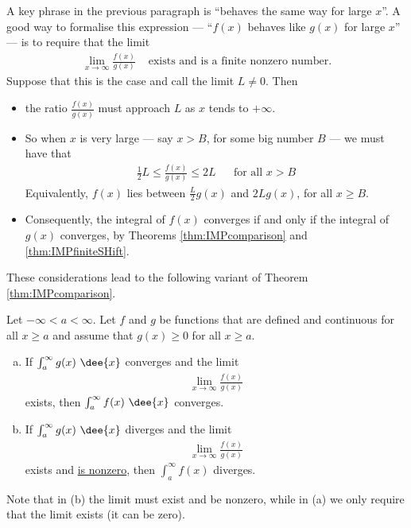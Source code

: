 A key phrase in the previous paragraph is ``behaves the same way for large
$x$''. A good way to formalise this expression --- ``$f(x)$ behaves like $g(x)$
for large $x$'' --- is to require that the limit
\begin{align*}
\lim_{x\rightarrow\infty}\frac{f(x)}{g(x)} & \text{ exists and is a finite
nonzero number.}
\end{align*}
Suppose that this is the case and call the limit $L\ne 0$. Then
\begin{itemize}
 \item the ratio $\frac{f(x)}{g(x)}$ must approach $L$ as $x$
tends to $+\infty$.
\item So when $x$ is very large --- say $x>B$, for some
big number $B$ --- we must have that
\begin{align*}
  \frac{1}{2}L \leq \frac{f(x)}{g(x)} \leq 2L && \text{for all $x>B$}
\end{align*}
Equivalently, $f(x)$ lies between $\frac{L}{2}g(x)$ and $2Lg(x)$, for all
$x\ge B$.

\item Consequently, the integral of $f(x)$ converges if and only if the
integral of $g(x)$ converges, by Theorems \ref{thm:IMPcomparison} and
\ref{thm:IMPfiniteSHift}.
\end{itemize}
These considerations lead to the following variant of Theorem
\ref{thm:IMPcomparison}.

\begin{theorem}\label{thm:IMPcomparisonLim}
Let $-\infty<a<\infty$. Let $f$ and $g$ be functions that are defined
and continuous for all $x\ge a$ and assume that  $g(x)\ge 0$ for all
$x\ge a$.
\begin{enumerate}[(a)]
\item If  $\int_a^\infty g(x)\ \dee{x}$ converges and the limit
\begin{align*}
\lim_{x\rightarrow\infty}\frac{f(x)}{g(x)}
\end{align*}
exists, then $\int_a^\infty f(x)\ \dee{x}$ converges.
\item If $\int_a^\infty g(x)\ \dee{x}$  diverges and the limit
\begin{align*}
\lim_{x\rightarrow\infty}\frac{f(x)}{g(x)}
\end{align*}
exists and \underline{is nonzero}, then $\int_a^\infty f(x)$ diverges.
\end{enumerate}
Note that in (b) the limit must exist and be nonzero, while in (a) we only
require that the limit exists (it can be zero).
\end{theorem}

